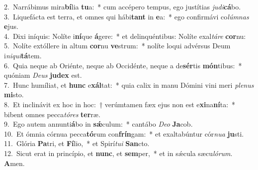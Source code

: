 {2.~}Narrábimus mira\textbf{bí}lia \textbf{tu}a:~* cum accépero tempus, ego justítias \textit{ju}\textit{di}\textbf{cá}bo.\\
{3.~}Liquefácta est terra, et omnes qui hábi\textbf{tant} in \textbf{e}a:~* ego confirmávi co\textit{lúm}\textit{nas} \textbf{e}jus.\\
{4.~}Dixi iníquis: Nolíte i\textbf{ní}que \textbf{á}gere:~* et delinquéntibus: Nolíte exal\textit{tá}\textit{re} \textbf{cor}nu:\\
{5.~}Nolíte extóllere in altum \textbf{cor}nu \textbf{ve}strum:~* nolíte loqui advérsus Deum i\textit{ni}\textit{qui}\textbf{tá}tem.\\
{6.~}Quia neque ab Oriénte, neque ab Occidénte, neque a de\textbf{sér}tis \textbf{món}tibus:~* quóniam \textit{De}\textit{us} \textbf{ju}\textbf{dex} est.\\
{7.~}Hunc humíliat, et \textbf{hunc} e\textbf{xál}tat:~* quia calix in manu Dómini vini meri \textit{ple}\textit{nus} \textbf{mi}sto.\\
{8.~}Et inclinávit ex hoc in hoc:~† verúmtamen fæx ejus non est e\textbf{xi}na\textbf{ní}ta:~* bibent omnes pecca\textit{tó}\textit{res} \textbf{ter}ræ.\\
{9.~}Ego autem annunti\textbf{á}bo in \textbf{sǽ}culum:~* cantábo \textit{De}\textit{o} \textbf{Ja}cob.\\
{10.~}Et ómnia córnua pecca\textbf{tó}rum con\textbf{frín}gam:~* et exaltabúntur cór\textit{nu}\textit{a} \textbf{ju}sti.\\
{11.~}Glória \textbf{Pa}tri, et \textbf{Fí}lio,~* et Spirí\textit{tu}\textit{i} \textbf{San}cto.\\
{12.~}Sicut erat in princípio, et \textbf{nunc}, et \textbf{sem}per,~* et in sǽcula sæcu\textit{ló}\textit{rum}. \textbf{A}men.\\
